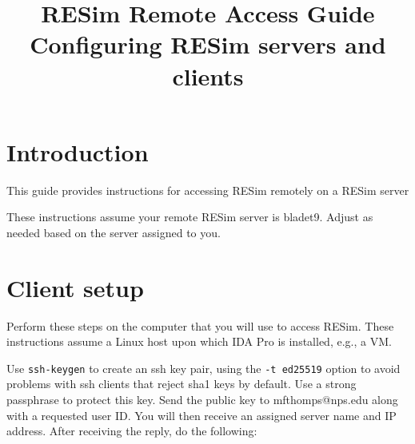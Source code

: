 \documentclass[titlepage]{article}
\begin{document}
\title {%
  RESim Remote Access Guide \\
  \large Configuring RESim servers and clients}
\maketitle
\section{Introduction}

This guide provides instructions for accessing RESim remotely on a RESim server

These instructions assume your remote RESim server is bladet9.  Adjust as needed based on the
server assigned to you.

\section{Client setup}
Perform these steps on the computer that you will use to access RESim.  These instructions
assume a Linux host upon which IDA Pro is installed, e.g., a VM.

Use {\tt ssh-keygen} to create an ssh key pair, using the {\tt -t ed25519} option to avoid problems with ssh
clients that reject sha1 keys by default.  Use a strong passphrase to protect this key.
Send the public key to mfthomps@nps.edu along with a requested user ID. 
You will then receive an assigned server name and IP address.
After receiving the reply, do the following:
\end{document}
